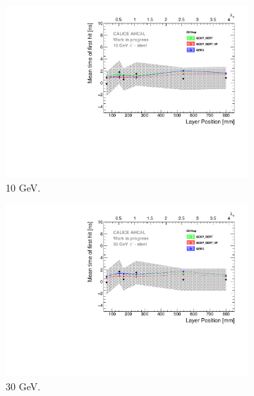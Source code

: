 \begin{figure}[htbp!]
  \begin{subfigure}[t]{0.5\textwidth}
    \centering
    \includegraphics[width=1\textwidth]{../Thesis_Plots/Timing/Pions/Plots/ComparisonToSim/Time_Depth_10GeV_DD4hep.pdf}
    \caption{10 GeV.}\label{fig:Depth_SimData_10GeV_DD4hep}
  \end{subfigure}
  \hfill
  \begin{subfigure}[t]{0.5\textwidth}
    \centering
    \includegraphics[width=1\textwidth]{../Thesis_Plots/Timing/Pions/Plots/ComparisonToSim/Time_Depth_30GeV_DD4hep.pdf}
    \caption{30 GeV.} \label{fig:Depth_SimData_30GeV_DD4hep}
  \end{subfigure}
  \hfill
  \begin{subfigure}[t]{0.5\textwidth}
    \centering

\end{subfigure}
\end{figure}
